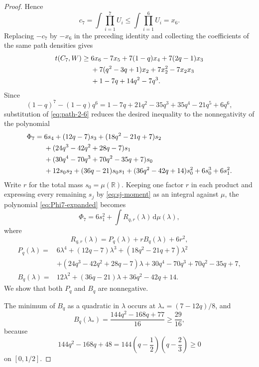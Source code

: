 ﻿\documentclass[11pt]{article}
\numberwithin{equation}{section}
\newcommand{\R}{\mathbb R}
\newcommand{\dd}{\,\mathrm d}
\begin{document}
\begin{proof}
  Hence
  \[
    c_7=\int\prod_{i=1}^7U_i
    \le\int\prod_{i=1}^6U_i=x_6.
  \]
  Replacing $-c_7$ by $-x_6$ in the preceding identity and collecting the coefficients of the same path densities gives
  \begin{align}
    t(C_7,W)\ge{}&6x_6-7x_5+7(1-q)x_4+7(2q-1)x_3 \notag\\
    &+7(q^2-3q+1)x_2+7x_2^2-7x_2x_3 \notag\\
    &+1-7q+14q^2-7q^3. \label{eq:C7-IE}
  \end{align}
  Since
  \[
    (1-q)^7-(1-q)q^6
    =1-7q+21q^2-35q^3+35q^4-21q^5+6q^6,
  \]
  substitution of \eqref{eq:path-2-6} reduces the desired inequality to the nonnegativity of the polynomial
  \begin{align}
    \Phi_7={}&6s_4+(12q-7)s_3+(18q^2-21q+7)s_2 \notag\\
    &+(24q^3-42q^2+28q-7)s_1 \notag\\
    &+(30q^4-70q^3+70q^2-35q+7)s_0 \notag\\
    &+12s_0s_2+(36q-21)s_0s_1
    +(36q^2-42q+14)s_0^2+6s_0^3+6s_1^2. \label{eq:Phi7-expanded}
  \end{align}
  Write $r$ for the total mass $s_0=\mu(\R)$.
  Keeping one factor $r$ in each product and expressing every remaining $s_j$ by \eqref{eq:sj-moment} as an integral against $\mu$, the polynomial \eqref{eq:Phi7-expanded} becomes
  \begin{equation}\label{eq:Phi7-integral}
    \Phi_7=6s_1^2+\int R_{q,r}(\lambda)\dd\mu(\lambda),
  \end{equation}
  where
  \[
    R_{q,r}(\lambda)=P_q(\lambda)+rB_q(\lambda)+6r^2,
  \]
  \begin{align*}
    P_q(\lambda)={}&6\lambda^4+(12q-7)\lambda^3
    +(18q^2-21q+7)\lambda^2\\
    &+(24q^3-42q^2+28q-7)\lambda
    +30q^4-70q^3+70q^2-35q+7,\\
    B_q(\lambda)={}&12\lambda^2+(36q-21)\lambda+36q^2-42q+14.
  \end{align*}
  We show that both $P_q$ and $B_q$ are nonnegative.

  The minimum of $B_q$ as a quadratic in $\lambda$ occurs at $\lambda_*=(7-12q)/8$, and
  \[
    B_q(\lambda_*)=\frac{144q^2-168q+77}{16}\ge\frac{29}{16},
  \]
  because
  \[
    144q^2-168q+48=144\left(q-\frac{1}{2}\right)
    \left(q-\frac{2}{3}\right)\ge0
  \]
  on $[0,1/2]$.


\end{proof}
\end{document}
